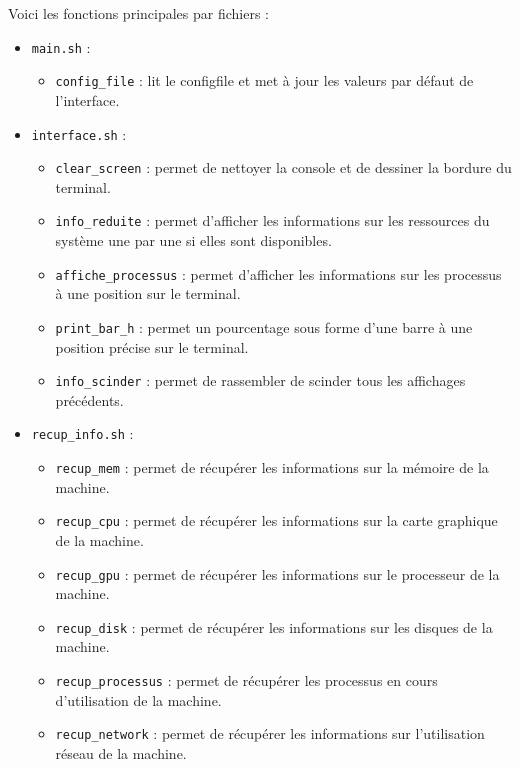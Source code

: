 \documentclass{article}
\begin{document}
\newpage
Voici les fonctions principales par fichiers :
\begin{itemize}
    \item \texttt{main.sh} :
        \begin{itemize}[label=\textbullet]
            \item \texttt{config\_file} : lit le configfile et met à jour les valeurs par défaut de l'interface.
        \end{itemize}
    \vspace{0.3em}
    \item \texttt{interface.sh} :
        \begin{itemize}[label=\textbullet]
            \item {\texttt{clear\_screen}} : permet de nettoyer la console et de dessiner la bordure du terminal.
            \item \texttt{info\_reduite} : permet d'afficher les informations sur les ressources du système une par une si elles sont disponibles.
            \item \texttt{affiche\_processus} : permet d'afficher les informations sur les processus à une position sur le terminal.
            \item \texttt{print\_bar\_h} : permet un pourcentage sous forme d'une barre à une position précise sur le terminal.
            \item \texttt{info\_scinder} : permet de rassembler de scinder tous les affichages précédents.
        \end{itemize}
        \vspace{0.3em}
    \item \texttt{recup\_info.sh} :
        \begin{itemize}[label=\textbullet]
            \item \texttt{recup\_mem} : permet de récupérer les informations sur la mémoire de la machine.
            \item \texttt{recup\_cpu} : permet de récupérer les informations sur la carte graphique de la machine.
            \item \texttt{recup\_gpu} : permet de récupérer les informations sur le processeur de la machine.
            \item \texttt{recup\_disk} : permet de récupérer les informations sur les disques de la machine.
            \item \texttt{recup\_processus} : permet de récupérer les processus en cours d'utilisation de la machine.
            \item \texttt{recup\_network} : permet de récupérer les informations sur l'utilisation réseau de la machine.

\end{itemize}
\end{itemize}
\end{document}
